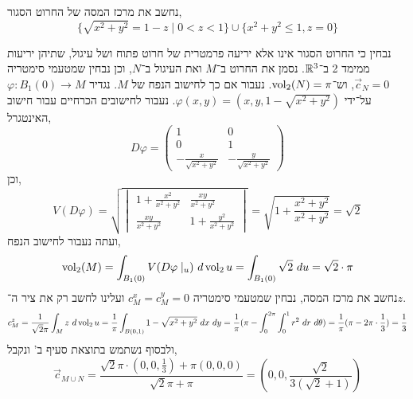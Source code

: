 \subquestion{}
נחשב את מרכז המסה של החרוט הסגור,
\[
	\{ \sqrt{x^2 + y^2} = 1 - z \mid 0 < z < 1 \} \cup \{ x^2 + y^2 \le 1, z = 0 \}
\]
\begin{solution}
	נבחין כי החרוט הסגור אינו אלא יריעה פרמטרית של חרוט פתוח ושל עיגול, שתיהן יריעות ממימד 2 ב־$\mathbb{R}^3$.
	נסמן את החרוט ב־$M$ ואת העיגול ב־$N$, וכן נבחין שמטעמי סימטריה $\vec{c}_N = 0$, וש־$\operatorname{vol}_2(N) = \pi$.
	נעבור אם כך לחישוב הנפח של $M$.
	נגדיר $\varphi : B_1(0) \to M$ על־ידי $\varphi(x, y) = (x, y, 1 - \sqrt{x^2 + y^2})$.
	נעבור לחישובים הכרחיים עבור חישוב האינטגרל,
	\[
		D\varphi
		= \begin{pmatrix}
			1 & 0 \\
			0 & 1 \\
			-\frac{x}{\sqrt{x^2 + y^2}} & -\frac{y}{\sqrt{x^2 + y^2}}
		\end{pmatrix}
	\]
	וכן,
	\[
		V(D\varphi)
		= \sqrt{\begin{vmatrix}
				1 + \frac{x^2}{x^2 + y^2} & \frac{xy}{x^2 + y^2} \\
				\frac{xy}{x^2 + y^2} & 1 + \frac{y^2}{x^2 + y^2}
		\end{vmatrix}}
		= \sqrt{1 + \frac{x^2 + y^2}{x^2 + y^2}}
		= \sqrt{2}
	\]
	ועתה נעבור לחישוב הנפח,
	\[
		\operatorname{vol}_2(M)
		= \int_{B_1(0)} V(D\varphi \mid_u)\ d\operatorname{vol}_2 u
		= \int_{B_1(0)} \sqrt{2}\ du
		= \sqrt{2} \cdot \pi
	\]
	נחשב את מרכז המסה, נבחין שמטעמי סימטריה $c_M^x = c_M^y = 0$ ועלינו לחשב רק את ציר ה־$z$.
	\[
		c_M^z
		= \frac{1}{\sqrt{2} \pi} \int_M z\ d\operatorname{vol}_2 u
		= \frac{1}{\pi} \int_{B(0, 1)} 1 - \sqrt{x^2 + y^2}\ dx\ dy
		= \frac{1}{\pi} (\pi - \int_{0}^{2 \pi} \int_{0}^{1} r^2\ dr\ d \theta)
		= \frac{1}{\pi} (\pi - 2 \pi \cdot \frac{1}{3})
		= \frac{1}{3}
	\]
	ולבסוף נשתמש בתוצאת סעיף ב' ונקבל,
	\[
		\vec{c}_{M \cup N}
		= \frac{\sqrt{2}\pi \cdot (0, 0, \frac{1}{3}) + \pi (0, 0, 0)}{\sqrt{2}\pi + \pi}
		= \left(0, 0, \frac{\sqrt{2}}{3(\sqrt{2} + 1)}\right)
	\]
\end{solution}


